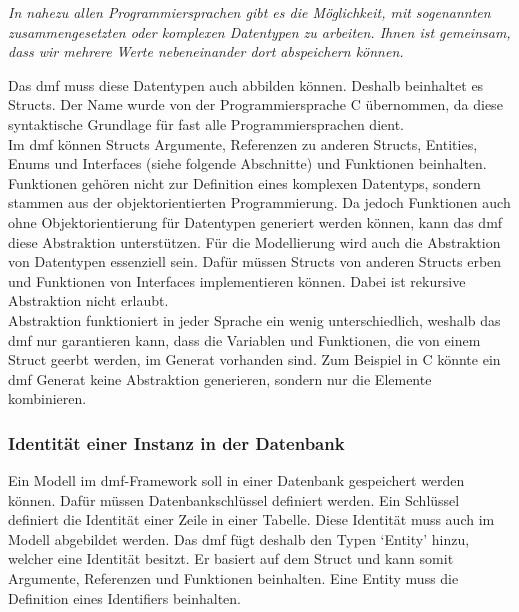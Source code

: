 \documentclass[./einleitung.tex]{subfiles}
\begin{document}
    \begin{center}
        \textit{
            In nahezu allen Programmiersprachen gibt es die Möglichkeit, mit sogenannten zusammengesetzten oder komplexen Datentypen zu arbeiten. Ihnen ist gemeinsam, dass wir mehrere Werte nebeneinander dort abspeichern können.\cite{978-3-8348-9999-6.pdf}}
    \end{center}
    Das \acrshort{dmf} muss diese Datentypen auch abbilden können.
    Deshalb beinhaltet es Structs.
    Der Name wurde von der Programmiersprache C übernommen, da diese syntaktische Grundlage für fast alle Programmiersprachen dient. \\
    Im \acrshort{dmf} können Structs Argumente, Referenzen zu anderen Structs, Entities, Enums und Interfaces (siehe folgende Abschnitte) und Funktionen beinhalten.
    Funktionen gehören nicht zur Definition eines komplexen Datentyps, sondern stammen aus der objektorientierten Programmierung.
    Da jedoch Funktionen auch ohne Objektorientierung für Datentypen generiert werden können, kann das \acrshort{dmf} diese Abstraktion unterstützen.
    \newline
    Für die Modellierung wird auch die Abstraktion von Datentypen essenziell sein.
    Dafür müssen Structs von anderen Structs erben und Funktionen von Interfaces implementieren können.
    Dabei ist rekursive Abstraktion nicht erlaubt.\\
    Abstraktion funktioniert in jeder Sprache ein wenig unterschiedlich, weshalb das \acrshort{dmf} nur garantieren kann, dass die Variablen und Funktionen, die von einem Struct geerbt werden, im Generat vorhanden sind.
    Zum Beispiel in C könnte ein \acrshort{dmf} Generat keine Abstraktion generieren, sondern nur die Elemente kombinieren.

    \subsubsection{Identität einer Instanz in der Datenbank}
    Ein Modell im \acrshort{dmf}-Framework soll in einer Datenbank gespeichert werden können.
    Dafür müssen Datenbankschlüssel definiert werden.
    Ein Schlüssel definiert die Identität einer Zeile in einer Tabelle.
    Diese Identität muss auch im Modell abgebildet werden.
    Das \acrshort{dmf} fügt deshalb den Typen `Entity' hinzu, welcher eine Identität besitzt.
    Er basiert auf dem Struct und kann somit Argumente, Referenzen und Funktionen beinhalten.
    Eine Entity muss die Definition eines Identifiers beinhalten. \\
\end{document}
